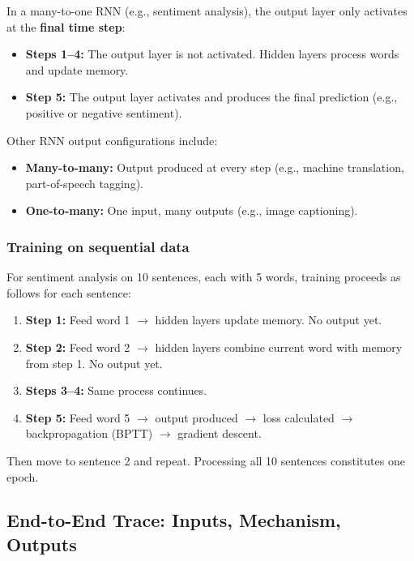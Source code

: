 In a many-to-one RNN (e.g., sentiment analysis), the output layer only activates at the
\textbf{final time step}:

\begin{itemize}
    \item \textbf{Steps 1--4:} The output layer is not activated. Hidden layers process
          words and update memory.
    \item \textbf{Step 5:} The output layer activates and produces the final prediction
          (e.g., positive or negative sentiment).
\end{itemize}

Other RNN output configurations include:
\begin{itemize}
    \item \textbf{Many-to-many:} Output produced at every step (e.g., machine
          translation, part-of-speech tagging).
    \item \textbf{One-to-many:} One input, many outputs (e.g., image captioning).
\end{itemize}

\subsubsection{Training on sequential data}

For sentiment analysis on 10 sentences, each with 5 words, training proceeds as follows
for each sentence:

\begin{enumerate}
    \item \textbf{Step 1:} Feed word 1 $\to$ hidden layers update memory. No output yet.
    \item \textbf{Step 2:} Feed word 2 $\to$ hidden layers combine current word with
          memory from step 1. No output yet.
    \item \textbf{Steps 3--4:} Same process continues.
    \item \textbf{Step 5:} Feed word 5 $\to$ output produced $\to$ loss calculated $\to$
          backpropagation (BPTT) $\to$ gradient descent.
\end{enumerate}

Then move to sentence 2 and repeat. Processing all 10 sentences constitutes one epoch.

\subsection{End-to-End Trace: Inputs, Mechanism, Outputs}

